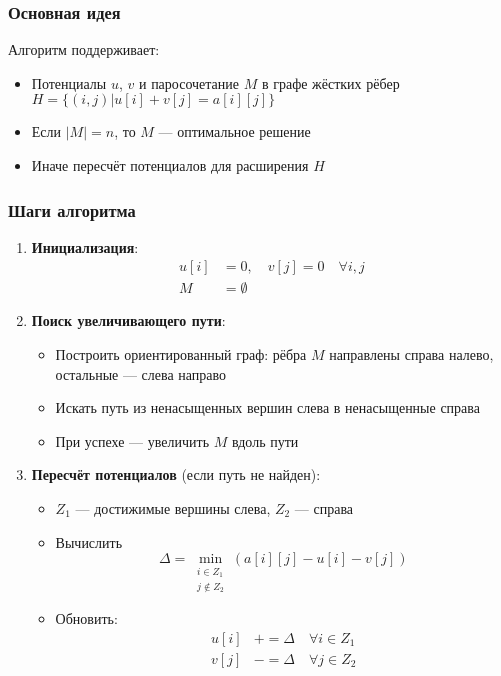 \documentclass[a4paper,14pt]{extarticle}
\begin{document}
\subsubsection*{Основная идея}
Алгоритм поддерживает:
\begin{itemize}
\item Потенциалы $u$, $v$ и паросочетание $M$ в графе жёстких рёбер $H = \{(i,j) | u[i]+v[j] = a[i][j]\}$
\item Если $|M| = n$, то $M$ — оптимальное решение
\item Иначе пересчёт потенциалов для расширения $H$
\end{itemize}

\subsubsection*{Шаги алгоритма}
\begin{enumerate}
\item \textbf{Инициализация}: 
\begin{align*}
u[i] &= 0, \quad v[j] = 0 \quad \forall i,j \\
M &= \emptyset 
\end{align*}

\item \textbf{Поиск увеличивающего пути}:
\begin{itemize}
\item Построить ориентированный граф: рёбра $M$ направлены справа налево, остальные — слева направо
\item Искать путь из ненасыщенных вершин слева в ненасыщенные справа
\item При успехе — увеличить $M$ вдоль пути
\end{itemize}

\item \textbf{Пересчёт потенциалов} (если путь не найден):
\begin{itemize}
\item $Z_1$ — достижимые вершины слева, $Z_2$ — справа
\item Вычислить 
\[
\Delta = \min_{\substack{i \in Z_1 \\ j \notin Z_2}} (a[i][j] - u[i] - v[j])
\]
\item Обновить:
\begin{align*}
u[i] &+= \Delta \quad \forall i \in Z_1 \\
v[j] &-= \Delta \quad \forall j \in Z_2
\end{align*}
\end{itemize}
\end{enumerate}
\end{document}
